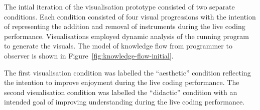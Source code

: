 The intial iteration of the visualisation prototype consisted of two separate conditions. Each condition consisted of four visual progressions with the intention of representing the addition and removal of instruments during the live coding performance. Visualisations employed dynamic analysis of the running program to generate the visuals. The model of knowledge flow from programmer to observer is shown in Figure~\ref{fig:knowledge-flow-initial}.

The first visualisation condition was labelled the ``aesthetic'' condition reflecting the intention to improve enjoyment during the live coding performance. The second visualisation condition was labelled the ``didactic'' condition with an intended goal of improving understanding during the live coding performance.






